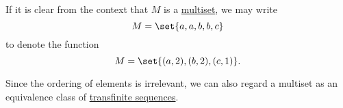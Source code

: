 \begin{remark}\label{rem:multiset_notation}
  If it is clear from the context that \( M \) is a \hyperref[def:labeled_set/multiset]{multiset}, we may write
  \begin{equation*}
    M = \set{ a, a, b, b, c }
  \end{equation*}
  to denote the function
  \begin{equation*}
    M = \set{ (a, 2), (b, 2), (c, 1) }.
  \end{equation*}

  Since the ordering of elements is irrelevant, we can also regard a multiset as an equivalence class of \hyperref[def:transfinite_sequence]{transfinite sequences}.
\end{remark}
